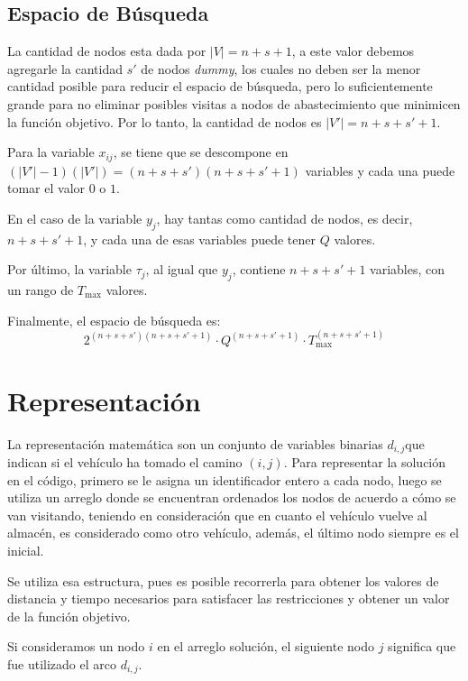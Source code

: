 \documentclass[letter, 10pt]{article}
\begin{document}
\subsection{Espacio de Búsqueda}
La cantidad de nodos esta dada por \(|V| = n + s + 1\), a este valor debemos agregarle la cantidad \(s'\) de nodos
 \textit{dummy}, los cuales no deben ser la menor cantidad posible para reducir el espacio de búsqueda, pero lo
 suficientemente grande para no eliminar posibles visitas a nodos de abastecimiento que minimicen la función objetivo.
 Por lo tanto, la cantidad de nodos es \(|V'| = n + s + s' + 1\).
 
 Para la variable \(x_{ij}\), se tiene que se descompone en \((|V'| - 1)(|V'|) = (n + s + s')(n + s + s' + 1) \) variables y cada una puede tomar el valor \(0\) o \(1\).
 
 En el caso de la variable \(y_j\), hay tantas como cantidad de nodos, es decir, \(n + s + s' + 1\), y cada una de esas
 variables puede tener \(Q\) valores.
 
 Por último, la variable \(\tau_j\), al igual que \(y_j\), contiene \(n + s + s' + 1\) variables, con un rango de
  \(T_{\mbox{max}}\) valores.
 
 Finalmente, el espacio de búsqueda es:
 \begin{equation*}
 2^{(n + s + s')(n + s + s' + 1)} \cdot Q^{(n + s + s' + 1)} \cdot T_{\mbox{max}}^{(n + s + s' + 1)}
 \end{equation*}

\section{Representaci\'on}
La representación matemática son un conjunto de variables binarias \(d_{i,j}\)que indican si el vehículo
ha tomado el camino \((i,j)\). Para representar la solución en el código, primero se le asigna un identificador entero a cada nodo, luego se utiliza un arreglo donde se encuentran ordenados los nodos
de acuerdo a cómo se van visitando, teniendo en consideración que en
cuanto el vehículo vuelve al almacén, es considerado como otro vehículo, además, el último nodo siempre es el inicial.

Se utiliza esa estructura, pues es posible recorrerla para obtener los valores de distancia y tiempo
necesarios para satisfacer las restricciones y obtener un valor de la función objetivo.

Si consideramos un nodo \(i\) en el arreglo solución, el siguiente nodo \(j\) significa que fue
utilizado el arco \(d_{i,j}\).
\end{document}
